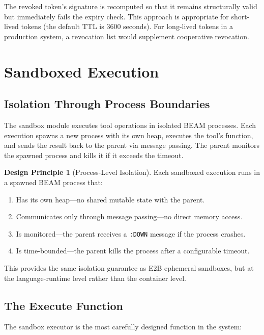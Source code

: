 \documentclass[12pt,a4paper]{article}
\theoremstyle{plain}
\theoremstyle{definition}
\newtheorem{designprinciple}[theorem]{Design Principle}
\begin{document}
The revoked token's signature is recomputed so that it remains structurally valid but immediately fails the expiry check. This approach is appropriate for short-lived tokens (the default TTL is 3600 seconds). For long-lived tokens in a production system, a revocation list would supplement cooperative revocation.


\section{Sandboxed Execution}
\label{sec:sandbox}

\subsection{Isolation Through Process Boundaries}

The sandbox module executes tool operations in isolated BEAM processes. Each execution spawns a new process with its own heap, executes the tool's function, and sends the result back to the parent via message passing. The parent monitors the spawned process and kills it if it exceeds the timeout.

\begin{designprinciple}[Process-Level Isolation]
\label{dp:isolation}
Each sandboxed execution runs in a spawned BEAM process that:
\begin{enumerate}
\item Has its own heap---no shared mutable state with the parent.
\item Communicates only through message passing---no direct memory access.
\item Is monitored---the parent receives a \texttt{:DOWN} message if the process crashes.
\item Is time-bounded---the parent kills the process after a configurable timeout.
\end{enumerate}
This provides the same isolation guarantee as E2B ephemeral sandboxes, but at the language-runtime level rather than the container level.
\end{designprinciple}

\subsection{The Execute Function}

The sandbox executor is the most carefully designed function in the system:
\end{document}
